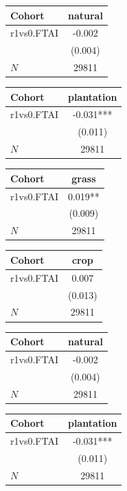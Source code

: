 {
\def\sym#1{\ifmmode^{#1}\else\(^{#1}\)\fi}
\begin{tabular}{l*{1}{c}}
\toprule
Cohort    &  natural   \\
\midrule
r1vs0.FTAI&   -0.002   \\
          &  (0.004)   \\
\midrule
\(N\)     &    29811   \\
\bottomrule
\end{tabular}
}
{
\def\sym#1{\ifmmode^{#1}\else\(^{#1}\)\fi}
\begin{tabular}{l*{1}{c}}
\toprule
Cohort    &plantation   \\
\midrule
r1vs0.FTAI&   -0.031***\\
          &  (0.011)   \\
\midrule
\(N\)     &    29811   \\
\bottomrule
\end{tabular}
}
{
\def\sym#1{\ifmmode^{#1}\else\(^{#1}\)\fi}
\begin{tabular}{l*{1}{c}}
\toprule
Cohort    &    grass   \\
\midrule
r1vs0.FTAI&    0.019** \\
          &  (0.009)   \\
\midrule
\(N\)     &    29811   \\
\bottomrule
\end{tabular}
}
{
\def\sym#1{\ifmmode^{#1}\else\(^{#1}\)\fi}
\begin{tabular}{l*{1}{c}}
\toprule
Cohort    &     crop   \\
\midrule
r1vs0.FTAI&    0.007   \\
          &  (0.013)   \\
\midrule
\(N\)     &    29811   \\
\bottomrule
\end{tabular}
}
{
\def\sym#1{\ifmmode^{#1}\else\(^{#1}\)\fi}
\begin{tabular}{l*{1}{c}}
\toprule
Cohort    &  natural   \\
\midrule
r1vs0.FTAI&   -0.002   \\
          &  (0.004)   \\
\midrule
\(N\)     &    29811   \\
\bottomrule
\end{tabular}
}
{
\def\sym#1{\ifmmode^{#1}\else\(^{#1}\)\fi}
\begin{tabular}{l*{1}{c}}
\toprule
Cohort    &plantation   \\
\midrule
r1vs0.FTAI&   -0.031***\\
          &  (0.011)   \\
\midrule
\(N\)     &    29811   \\
\bottomrule
\end{tabular}
}
